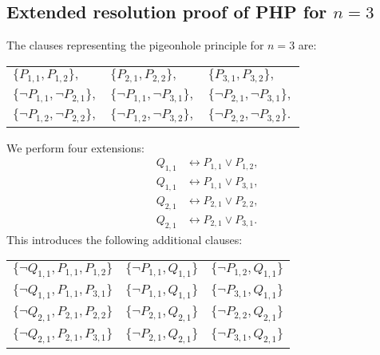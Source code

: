 \begin{appendices}

\section{Extended resolution proof of PHP for $n=3$}

The clauses representing the pigeonhole principle for $n=3$ are:

\begin{center}
  \begin{tabular}{lll}
    $\{P_{1,1}, P_{1,2}\},$ & $\{P_{2,1}, P_{2,2}\},$ & $\{P_{3,1}, P_{3,2}\},$ \\
    $\{\neg P_{1,1}, \neg P_{2,1}\},$ & $\{\neg P_{1,1}, \neg P_{3,1}\},$ & $\{\neg P_{2,1}, \neg P_{3,1}\},$ \\
    $\{\neg P_{1,2}, \neg P_{2,2}\},$ & $\{\neg P_{1,2}, \neg P_{3,2}\},$ & $\{\neg P_{2,2}, \neg P_{3,2}\}.$
  \end{tabular}
\end{center}

We perform four extensions:
\begin{equation*}
  \begin{align*}
    Q_{1,1} &\leftrightarrow P_{1,1} \vee P_{1,2}, \\
    Q_{1,1} &\leftrightarrow P_{1,1} \vee P_{3,1}, \\
    Q_{2,1} &\leftrightarrow P_{2,1} \vee P_{2,2}, \\
    Q_{2,1} &\leftrightarrow P_{2,1} \vee P_{3,1}.
  \end{align*}
\end{equation*}
This introduces the following additional clauses:

\begin{center}
  \begin{tabular}{lll}
    $\{\neg Q_{1,1}, P_{1,1}, P_{1,2}\}$ &
    $\{\neg P_{1,1}, Q_{1,1}\}$ &
    $\{\neg P_{1,2}, Q_{1,1}\}$ \\
    $\{\neg Q_{1,1}, P_{1,1}, P_{3,1}\}$ &
    $\{\neg P_{1,1}, Q_{1,1}\}$ &
    $\{\neg P_{3,1}, Q_{1,1}\}$ \\
    $\{\neg Q_{2,1}, P_{2,1}, P_{2,2}\}$ &
    $\{\neg P_{2,1}, Q_{2,1}\}$ &
    $\{\neg P_{2,2}, Q_{2,1}\}$ \\
    $\{\neg Q_{2,1}, P_{2,1}, P_{3,1}\}$ &
    $\{\neg P_{2,1}, Q_{2,1}\}$ &
    $\{\neg P_{3,1}, Q_{2,1}\}$
  \end{tabular}
\end{center}


\end{appendices}
